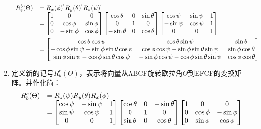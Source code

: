 \documentclass{article} %
\numberwithin{equation}{section} %
\begin{document}
\begin{enumerate}
\begin{equation}
\begin{array}{rl}
	{R}_{e}^{b}(\Theta)&=R_x(\phi)^{'}R_y(\theta)^{'}R_z(\psi)^{'}\\
	~&= \begin{bmatrix}1 & 0 & 0\\0 & \cos\phi & \sin\phi\\0 & -\sin\phi & \cos\phi\end{bmatrix}
	\begin{bmatrix}\cos\theta & 0 & \sin\theta\\0 & 1 & 0\\-\sin\theta & 0 & \cos\theta\end{bmatrix}
	\begin{bmatrix}\cos\psi & \sin\psi & 1\\-\sin\psi & \cos\psi & 1\\0 & 0 & 1\end{bmatrix}\vspace{1ex} \\
	~&= \begin{bmatrix}
		\cos\theta\cos\psi & \cos\theta\sin\psi & \sin\theta\\
		-\cos\phi\sin\psi - \sin\phi\sin\theta\cos\psi & 
			\cos\phi\cos\psi - \sin\phi\sin\theta\sin\psi & 
			\sin\phi\cos\theta\\
		\sin\phi\sin\psi - \cos\phi\sin\theta\cos\psi & 
			-\sin\phi\cos\psi - \cos\phi\sin\theta\sin\psi & 
			\cos\phi\cos\theta	
	\end{bmatrix}
\end{array}
\end{equation}
\item 定义新的记号${R}_{b}^{e}(\Theta)$，表示将向量从ABCF旋转欧拉角$\Theta$到EFCF的变换矩阵。并作化简：
\begin{equation}
\begin{array}{rl}
	{R}_{b}^{e}(\Theta)&=R_z(\psi)R_y(\theta)R_x(\phi)\\
	~&= \begin{bmatrix}\cos\psi & -\sin\psi & 1\\ \sin\psi & \cos\psi & 1\\0 & 0 & 1\end{bmatrix}
	\begin{bmatrix}\cos\theta & 0 & -\sin\theta\\0 & 1 & 0\\ \sin\theta & 0 & \cos\theta\end{bmatrix}
	\begin{bmatrix}1 & 0 & 0\\0 & \cos\phi & -\sin\phi\\0 & \sin\phi & \cos\phi\end{bmatrix}\vspace{1ex} \\

\end{array}
\end{equation}
\end{enumerate}
\end{document}
